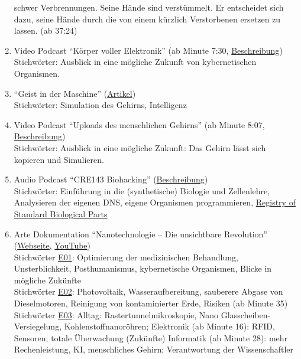 \begin{enumerate}
			schwer Verbrennungen. Seine Hände sind verstümmelt.
			Er entscheidet sich dazu, seine Hände durch die von einem kürzlich Verstorbenen ersetzen
			zu lassen. (ab 37:24)
	\item Video Podcast \enquote{Körper voller Elektronik}
		(ab Minute 7:30, \href{http://www.elektrischer-reporter.de/phase3/video/252}%
		{Beschreibung}) \\
		Stichwörter: Ausblick in eine mögliche Zukunft von kybernetischen Organismen.
	\item \enquote{Geist in der Maschine}
		(\href{http://www.heise.de/tr/artikel/Geist-in-der-Maschine-277969.html}{Artikel}) \\
		Stichwörter: Simulation des Gehirns, Intelligenz
	\item Video Podcast \enquote{Uploads des menschlichen Gehirns}
		(ab Minute 8:07, \href{http://www.elektrischer-reporter.de/phase3/video/267/}%
		{Beschreibung}) \\
		Stichwörter: Ausblick in eine mögliche Zukunft: Das Gehirn lässt sich kopieren und
			Simulieren.
	\item Audio Podcast \enquote{CRE143 Biohacking}
		(\href{http://cre.fm/cre143}{Beschreibung}) \\
		Stichwörter: Einführung in die (synthetische) Biologie und Zellenlehre,
			Analysieren der eigenen DNS, eigene Organismen programmieren,
			\href{http://partsregistry.org/Catalog}{Registry of Standard Biological Parts}
	\item Arte Dokumentation \enquote{Nanotechnologie -- Die unsichtbare Revolution}
		(\href{http://www.arte.tv/de/6338036.html}{Webseite},
		\href{https://www.youtube.com/watch?v=UoYLd4jUT5k}{YouTube}) \\
		Stichwörter \href{http://www.youtube.com/watch?v=TFLNWHsw4ro}{E01}:
			Optimierung der medizinischen Behandlung, Unsterblichkeit, Posthumanismus,
			kybernetische Organismen, Blicke in mögliche Zukünfte \\
		Stichwörter \href{http://www.youtube.com/watch?v=O2q6LfjSt_Y}{E02}:
			Photovoltaik, Wasseraufbereitung, sauberere Abgase von Dieselmotoren,
			Reinigung von kontaminierter Erde, Risiken (ab Minute 35) \\
		Stichwörter \href{http://www.youtube.com/watch?v=ATo85_43QdI}{E03}:
			Alltag: Rastertunnelmikroskopie, Nano Glasscheiben-Versiegelung,
			Kohlenstoffnanoröhren;
			Elektronik (ab Minute 16): RFID, Sensoren; totale Überwachung (Zukünfte)
			Informatik (ab Minute 28): mehr Rechenleistung, KI, menschliches Gehirn;
			Verantwortung der Wissenschaftler

\end{enumerate}
